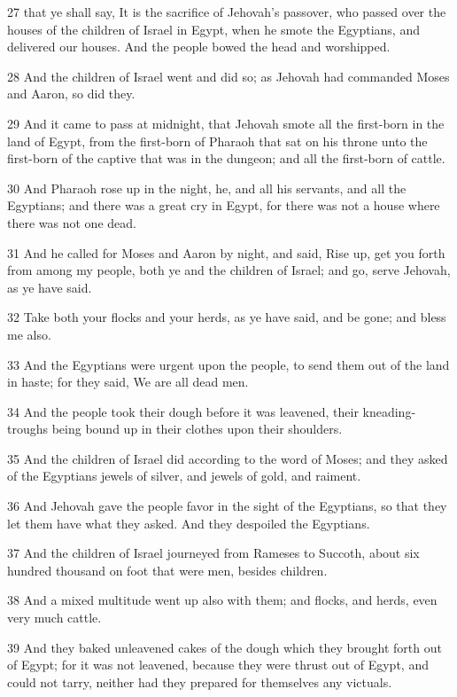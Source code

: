 \par 27 that ye shall say, It is the sacrifice of Jehovah's passover, who passed over the houses of the children of Israel in Egypt, when he smote the Egyptians, and delivered our houses. And the people bowed the head and worshipped.
\par 28 And the children of Israel went and did so; as Jehovah had commanded Moses and Aaron, so did they.
\par 29 And it came to pass at midnight, that Jehovah smote all the first-born in the land of Egypt, from the first-born of Pharaoh that sat on his throne unto the first-born of the captive that was in the dungeon; and all the first-born of cattle.
\par 30 And Pharaoh rose up in the night, he, and all his servants, and all the Egyptians; and there was a great cry in Egypt, for there was not a house where there was not one dead.
\par 31 And he called for Moses and Aaron by night, and said, Rise up, get you forth from among my people, both ye and the children of Israel; and go, serve Jehovah, as ye have said.
\par 32 Take both your flocks and your herds, as ye have said, and be gone; and bless me also.
\par 33 And the Egyptians were urgent upon the people, to send them out of the land in haste; for they said, We are all dead men.
\par 34 And the people took their dough before it was leavened, their kneading-troughs being bound up in their clothes upon their shoulders.
\par 35 And the children of Israel did according to the word of Moses; and they asked of the Egyptians jewels of silver, and jewels of gold, and raiment.
\par 36 And Jehovah gave the people favor in the sight of the Egyptians, so that they let them have what they asked. And they despoiled the Egyptians.
\par 37 And the children of Israel journeyed from Rameses to Succoth, about six hundred thousand on foot that were men, besides children.
\par 38 And a mixed multitude went up also with them; and flocks, and herds, even very much cattle.
\par 39 And they baked unleavened cakes of the dough which they brought forth out of Egypt; for it was not leavened, because they were thrust out of Egypt, and could not tarry, neither had they prepared for themselves any victuals.
